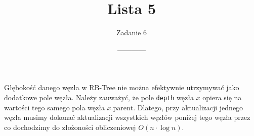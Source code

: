 \documentclass[14pt]{article}
\title{Lista 5}
\author{Zadanie 6}
\date{------------}
\begin{document}
\maketitle

Głębokość danego węzła w RB-Tree nie można efektywnie utrzymywać jako dodatkowe pole węzła.
Należy zauważyć, że pole \texttt{depth} węzła $x$ opiera się na wartości tego samego pola węzła $x.\mathrm{parent}$. Dlatego, przy aktualizacji jednego węzła musimy dokonać aktualizacji wszystkich węzłów poniżej tego węzła przez co dochodzimy do złożoności obliczeniowej $O(n\cdot \log n)$.
\end{document}
